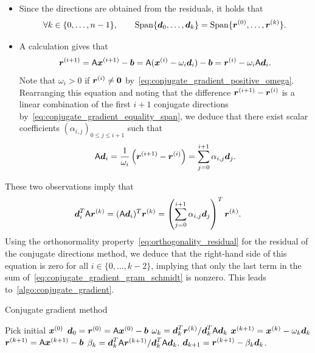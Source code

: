 \begin{itemize}
    \item
        Since the directions are obtained from the residuals,
        it holds that
        \begin{equation}
            \label{eq:conjugate_gradient_equality_span}
            \forall k \in \{0, \dotsc, n-1\}, \qquad
            \operatorname{Span}\{ \mathbf{\boldsymbol{d}}_0, \dotsc, \mathbf{\boldsymbol{d}}_{k} \} =
            \operatorname{Span}\{ \mathbf{\boldsymbol{r}}^{(0)}, \dotsc, \mathbf{\boldsymbol{r}}^{(k)} \}.
        \end{equation}

    \item
        A calculation gives that
        \begin{equation}
            \label{eq:conjugate_gradient_iteration_residual}
            \mathbf{\boldsymbol{r}}^{(i+1)}
            = \mathsf A \mathbf{\boldsymbol{x}}^{(i+1)} - \mathbf{\boldsymbol{b}}
            = \mathsf A(\mathbf{\boldsymbol{x}}^{(i)} - \omega_i \mathbf{\boldsymbol{d}}_i) - \mathbf{\boldsymbol{b}} = \mathbf{\boldsymbol{r}}^{(i)} - \omega_i \mathsf A \mathbf{\boldsymbol{d}}_i.
        \end{equation}
        Note that $\omega_i > 0$ if $\mathbf{\boldsymbol{r}}^{(i)} \neq \mathbf{\boldsymbol{0}}$ by~\eqref{eq:conjugate_gradient_positive_omega}.
        Rearranging this equation and noting that
        the difference $\mathbf{\boldsymbol{r}}^{(i+1)} - \mathbf{\boldsymbol{r}}^{(i)}$ is a linear combination of the first $i+1$ conjugate directions by~\eqref{eq:conjugate_gradient_equality_span},
        we deduce that there exist scalar coefficients $(\alpha_{i,j})_{0 \leq j \leq i+1}$ such that
        \[
            \mathsf A \mathbf{\boldsymbol{d}}_i
            = \frac{1}{\omega_i} \left( \mathbf{\boldsymbol{r}}^{(i+1)} - \mathbf{\boldsymbol{r}}^{(i)} \right)
            = \sum_{j=0}^{i+1} \alpha_{i,j} \mathbf{\boldsymbol{d}}_j.
        \]
\end{itemize}
These two observations imply that
\[
    \mathbf{\boldsymbol{d}}_i^T \mathsf A \mathbf{\boldsymbol{r}}^{(k)}
    = (\mathsf A \mathbf{\boldsymbol{d}}_i)^T \mathbf{\boldsymbol{r}}^{(k)}
    = \left(\sum_{j=0}^{i+1} \alpha_{i,j} \mathbf{\boldsymbol{d}}_j \right)^T \mathbf{\boldsymbol{r}}^{(k)}.
\]
Using the orthonormality property~\eqref{eq:orthogonality_residual} for the residual of the conjugate directions method,
we deduce that the right-hand side of this equation is zero for all $i \in \{0, \dotsc, k-2\}$,
implying that only the last term in the sum of~\eqref{eq:conjugate_gradient_gram_schmidt} is nonzero.
This leads to~\cref{algo:conjugate_gradient}.
\begin{algorithm}
    \caption{Conjugate gradient method}%
    \label{algo:conjugate_gradient}%
    \begin{algorithmic}[1]
        \State Pick initial $\mathbf{\boldsymbol{x}}^{(0)}$
        \State $\mathbf{\boldsymbol{d}}_0 = \mathbf{\boldsymbol{r}}^{(0)} = \mathsf A \mathbf{\boldsymbol{x}}^{(0)} - \mathbf{\boldsymbol{b}}$
            \EndIf
            \State $\omega_k = \mathbf{\boldsymbol{d}}_k^T \mathbf{\boldsymbol{r}}^{(k)}/\mathbf{\boldsymbol{d}}_k^T \mathsf A \mathbf{\boldsymbol{d}}_k$
            \State $\mathbf{\boldsymbol{x}}^{(k+1)} = \mathbf{\boldsymbol{x}}^{(k)} - \omega_k \mathbf{\boldsymbol{d}}_k$
            \State $\mathbf{\boldsymbol{r}}^{(k+1)} = \mathsf A \mathbf{\boldsymbol{x}}^{(k+1)} - \mathbf{\boldsymbol{b}}$
            \State $\beta_k  = \mathbf{\boldsymbol{d}}_k^T \mathsf A \mathbf{\boldsymbol{r}}^{(k+1)}/\mathbf{\boldsymbol{d}}_k^T \mathsf A \mathbf{\boldsymbol{d}}_k$.
            \State $\mathbf{\boldsymbol{d}}_{k+1}  = \mathbf{\boldsymbol{r}}^{(k+1)} - \beta_k \mathbf{\boldsymbol{d}}_k$.
        \EndFor
    \end{algorithmic}
\end{algorithm}

